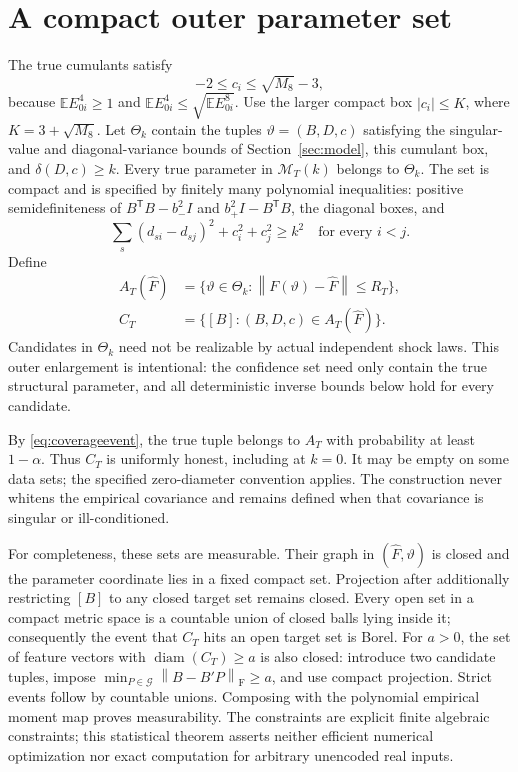 \documentclass[11pt,a4paper]{article}
\numberwithin{equation}{section}
\newcommand{\E}{\mathbb E}
\newcommand{\cM}{\mathcal M}
\newcommand{\cG}{\mathcal G}
\newcommand{\T}{\mathsf T}
\newcommand{\F}{\mathrm F}
\newcommand{\norm}[1]{\left\lVert #1\right\rVert}
\DeclareMathOperator{\diam}{diam}
\begin{document}
\section{A compact outer parameter set}\label{sec:outer}
The true cumulants satisfy
\[
 -2\le c_i\le\sqrt{M_8}-3,
\]
because \(\E E_{0i}^4\ge1\) and
\(\E E_{0i}^4\le\sqrt{\E E_{0i}^8}\).
Use the larger compact box \(|c_i|\le K\), where \(K=3+\sqrt{M_8}\).
Let \(\Theta_k\) contain the tuples \(\vartheta=(B,D,c)\) satisfying
the singular-value and diagonal-variance bounds of Section~\ref{sec:model},
this cumulant box, and \(\delta(D,c)\ge k\).
Every true parameter in \(\cM_T(k)\) belongs to \(\Theta_k\).
The set is compact and is specified by finitely many polynomial
inequalities: positive semidefiniteness of
\(B^\T B-b_-^2I\) and \(b_+^2I-B^\T B\), the diagonal boxes, and
\[
 \sum_s(d_{si}-d_{sj})^2+c_i^2+c_j^2\ge k^2
 \quad\text{for every }i<j.
\]
Define
\begin{equation}\label{eq:confidence}
 \begin{split}
 A_T(\widehat F)
   &=\{\vartheta\in\Theta_k:\norm{F(\vartheta)-\widehat F}\le R_T\},\\
 C_T&=\{[B]:(B,D,c)\in A_T(\widehat F)\}.
 \end{split}
\end{equation}
Candidates in \(\Theta_k\) need not be realizable by actual independent
shock laws. This outer enlargement is intentional: the confidence set
need only contain the true structural parameter, and all deterministic
inverse bounds below hold for every candidate.

By \eqref{eq:coverageevent}, the true tuple belongs to \(A_T\) with
probability at least \(1-\alpha\). Thus \(C_T\) is uniformly honest,
including at \(k=0\). It may be empty on some data sets; the specified
zero-diameter convention applies. The construction never whitens the
empirical covariance and remains defined when that covariance is singular
or ill-conditioned.

For completeness, these sets are measurable. Their graph in
\((\widehat F,\vartheta)\) is closed and the parameter coordinate lies in a
fixed compact set. Projection after additionally restricting \([B]\) to
any closed target set remains closed. Every open set in a compact metric
space is a countable union of closed balls lying inside it; consequently
the event that \(C_T\) hits an open target set is Borel.
For \(a>0\), the set of feature vectors with \(\diam(C_T)\ge a\) is also
closed: introduce two candidate tuples, impose
\(\min_{P\in\cG}\norm{B-B'P}_{\F}\ge a\), and use compact projection.
Strict events follow by countable unions. Composing with the polynomial
empirical moment map proves measurability.
The constraints are explicit finite algebraic constraints; this statistical
theorem asserts neither efficient numerical optimization nor exact
computation for arbitrary unencoded real inputs.
\end{document}
